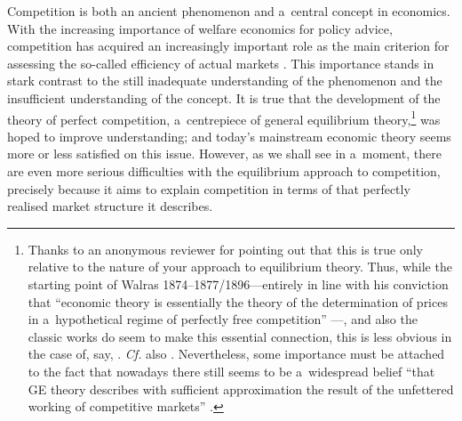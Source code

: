 Competition is both an ancient phenomenon and a~central concept in economics. With the increasing importance of welfare economics for policy advice, competition has acquired an increasingly important role as the main criterion for assessing the so-called efficiency of actual markets 
\parencites[e.g.,][]{motta_competition_2004}[][p.31ff.]{armentano_myths_1972}. %
 This importance stands in stark contrast to the still inadequate understanding of the phenomenon and the insufficient understanding of the concept. It is true that the development of the theory of perfect competition, a~centrepiece of general equilibrium theory,\footnote{Thanks to an anonymous reviewer for pointing out that this is true only relative to the nature of your approach to equilibrium theory. Thus, while the starting point of Walras 1874–1877/1896---entirely in line with his conviction that ``economic theory is essentially the theory of the determination of prices in a~hypothetical regime of perfectly free competition'' 
\parencite[][]{walras_lewalras_2019}%
---, and also the classic works 
\parencites[][]{edgeworth_mathematical_1881}[][]{marshall_principles_1890}[][]{arrow_existence_1954}[][]{mckenzie_equilibrium_1954} %
 do seem to make this essential connection, this is less obvious in the case of, say, 
\parencites[][]{wald_uber_1935}[][]{samuelson_foundations_1947}[][]{mas-colell_equilibrium_1974}. %
 \textit{Cf.} also 
\parencites[][]{mckenzie_classical_1981}[][]{weintraub_retrospectives_2011}. %
 Nevertheless, some importance must be attached to the fact that nowadays there still seems to be a~widespread belief ``that GE theory describes with sufficient approximation the result of the unfettered working of competitive markets'' 
\parencite[][p.8]{petri_general_2003}.%
} was hoped to improve understanding; and today's mainstream economic theory seems more or less satisfied on this issue. However, as we shall see in a~moment, there are even more serious difficulties with the equilibrium approach to competition, precisely because it aims to explain competition in terms of that perfectly realised market structure it describes.



